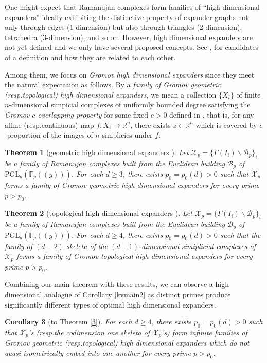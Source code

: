 \documentclass[letterpaper, reqno, 11pt]{amsart}
\newtheorem{theorem}{Theorem}[section]
\newtheorem{corollary}[theorem]{Corollary}
\theoremstyle{definition}
\theoremstyle{definition}
\theoremstyle{remark}
\begin{document}
One might expect that Ramanujan complexes form families of ``high dimensional expanders'' ideally exhibiting the distinctive property of expander graphs not only through edges (1-dimension) but also through triangles (2-dimension), tetrahedra (3-dimension), and so on. However, high dimensional expanders are not yet defined and we only have several proposed concepts. See \cite{lubotzky2014ramanujan}, \cite{lubotzky2018high} for candidates of a definition and how they are related to each other. 


Among them, we focus on \textit{Gromov high dimensional expanders} since they meet the natural expectation as follows. By a \textit{family of Gromov geometric (resp.\@ topological) high dimensional expanders},
we mean a collection $\{X_i\}$ of
finite $n$-dimensional simpicial complexes of 
uniformly bounded degree satisfying the \textit{Gromov $c$-overlapping property} for some fixed $c>0$ defined in \cite{gromov2010singularities}, that is, 
for any affine (resp.\@ continuous) map 
$f:X_i \to \mathbb{R}^n$,
there exists $z \in \mathbb{R}^n$ which is covered by $c$-proportion of the images of $n$-simplicies under $f$.


\begin{theorem} [geometric high dimensional expanders \cite{fox2012overlap, evra2017finite}] \label{geo}
    Let $\mathscr{X}_p= \{ \Gamma(I_i)\backslash \mathcal{B}_p \}_i$ be a family of Ramanujan complexes built from the Euclidean building $\mathcal{B}_p$ of $\mathrm{PGL}_d(\mathbb{F}_p((y)))$.
    For each $d \geq 3$, there exists $p_0=p_0(d) > 0$ such that $\mathscr{X}_p$ forms a family of Gromov geometric high dimensional expanders for every prime $p > p_0$. 
\end{theorem}

\begin{theorem}[topological high dimensional expanders \cite{kaufman2016isoperimetric, evra2024bounded}] \label{top}
    Let $\mathscr{X}_p= \{ \Gamma(I_i)\backslash \mathcal{B}_p \}_i$ be a family of Ramanujan complexes built from the Euclidean building $\mathcal{B}_p$ of $\mathrm{PGL}_d(\mathbb{F}_p((y)))$. For each $d \geq 4$, there exists $p_0=p_0(d) > 0$ such that the family of $(d-2)$-skeleta of the $(d-1)$-dimensional simiplicial complexes of $\mathscr{X}_p$ forms a family of Gromov topological high dimensional expanders for every prime $p > p_0$.
\end{theorem}




Combining our main theorem with these results, we can observe a high dimensional analogue of Corollary \ref{kvmain2} as distinct primes produce significantly different types of optimal high dimensional expanders.
\begin{corollary} [to Theorem \ref{3}] \label{coro} 
    For each $d \geq 4$, there exists $p_0 =p_0(d)>0$ such that $\mathscr{X}_p$'s (resp.\@ the codimension one skeleta of $\mathscr{X}_p$'s) form infinite families of Gromov geometric (resp.\@ topological) high dimensional expanders 
    which do not quasi-isometrically embed into one another 
    for every prime $p > p_0$.
\end{corollary}
\end{document}
